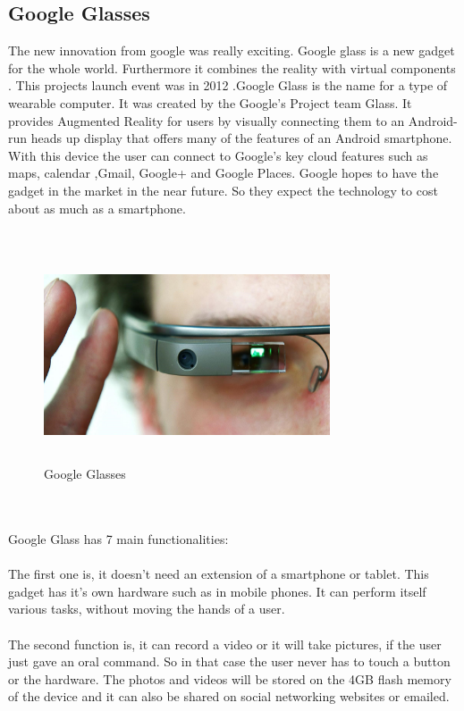  \subsection{Google Glasses}
 The new innovation from google was really exciting. Google glass is a new gadget for the whole world. Furthermore it combines the reality with virtual components . This projects launch event was in 2012 .Google Glass is the name for a type of wearable computer. It was created by the Google's Project team Glass. It provides Augmented Reality for users by visually connecting them to an Android-run heads up display that offers many of the features of an Android smartphone. With this device the user can connect to Google's key cloud features such as maps, calendar ,Gmail, Google+ and Google Places. Google hopes to have the gadget in the market in the near future. So they expect the technology to cost about as much as a smartphone.\cite{glasses01}
 \\
 \\
 \begin{figure}[htbp]
 \centering
 \includegraphics[width=240pt,height=180pt,keepaspectratio]{graphics/GoogleGlasses.jpg}
 \caption{Google Glasses\cite{glasses01}}
 \end{figure}
 \\
 \\
 Google Glass has 7 main functionalities\cite{functionsglasses}:
 \\
 \\
 The first one is, it doesn't need an extension of a smartphone or tablet. This gadget has it's own hardware such as in mobile phones. It can perform itself various tasks, without moving the hands of a user. 
 \\
 \\
 The second function is, it can record a video or it will take pictures, if the user just gave an oral command. So in that case the user never has to touch a button or the hardware. The photos and videos will be stored on the 4GB flash memory of the device and it can also be shared on social networking websites or emailed.
